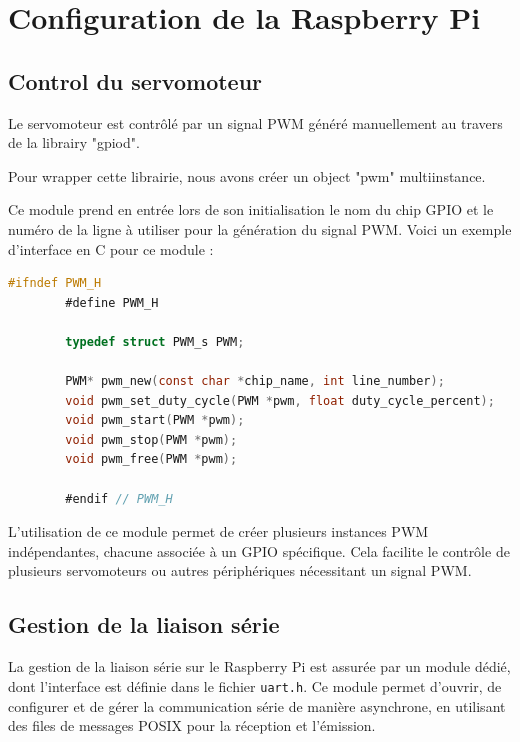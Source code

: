 \section{Configuration de la Raspberry Pi}

\subsection{Control du servomoteur}

    Le servomoteur est contrôlé par un signal PWM généré manuellement au travers de la librairy "gpiod".

    Pour wrapper cette librairie, nous avons créer un object "pwm" multiinstance.

    Ce module prend en entrée lors de son initialisation le nom du chip GPIO et le numéro de la ligne à utiliser pour la génération du signal PWM. Voici un exemple d'interface en C pour ce module :

    \begin{lstlisting}[language=C, caption={Interface du module PWM}, label={lst:pwmheader}]
        #ifndef PWM_H
        #define PWM_H

        typedef struct PWM_s PWM;

        PWM* pwm_new(const char *chip_name, int line_number);
        void pwm_set_duty_cycle(PWM *pwm, float duty_cycle_percent);
        void pwm_start(PWM *pwm);
        void pwm_stop(PWM *pwm);
        void pwm_free(PWM *pwm);

        #endif // PWM_H
    \end{lstlisting}

    L'utilisation de ce module permet de créer plusieurs instances PWM indépendantes, chacune associée à un GPIO spécifique. Cela facilite le contrôle de plusieurs servomoteurs ou autres périphériques nécessitant un signal PWM.

\subsection{Gestion de la liaison série}

    La gestion de la liaison série sur le Raspberry Pi est assurée par un module dédié, dont l'interface est définie dans le fichier \texttt{uart.h}. Ce module permet d'ouvrir, de configurer et de gérer la communication série de manière asynchrone, en utilisant des files de messages POSIX pour la réception et l'émission.

